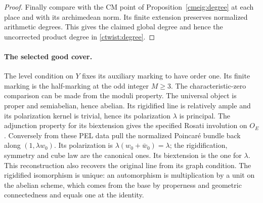 \begin{proof}
Finally compare with the CM point of Proposition~\ref{cmeig:degree}
at each place and with its archimedean norm. Its finite extension
preserves normalized arithmetic degrees. This gives the claimed
global degree and hence the uncorrected product degree in
\eqref{ctwist:degree}.
\end{proof}

\paragraph{The selected good cover.}
The level condition on \(Y\) fixes its auxiliary marking to have
order one. Its finite marking is the half-marking at the odd integer
\(M\ge3\).
The characteristic-zero comparison can be made from the moduli
property. The universal object is proper and semiabelian, hence
abelian. Its rigidified line is relatively ample and its
polarization kernel is trivial, hence its polarization \(\lambda\)
is principal. The adjunction property for its biextension gives
the specified Rosati involution on \(O_E\). Conversely from these
PEL data pull the normalized Poincar\'e bundle back along
\((1,\lambda w_0)\). Its polarization is
\(\lambda(w_0+\bar w_0)=\lambda\); the rigidification, symmetry
and cube law are the canonical ones. Its biextension is the
one for \(\lambda\). This reconstruction also recovers the
original line from its graph condition. The rigidified isomorphism
is unique: an automorphism is multiplication by a unit on the
abelian scheme, which comes from the base by properness and
geometric connectedness and equals one at the identity.

